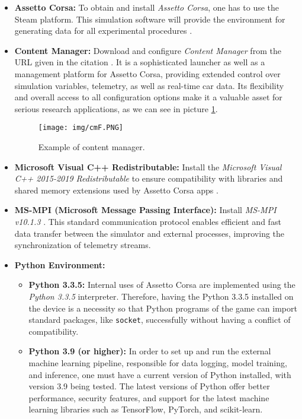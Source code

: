 \documentclass[a4paper,final,12pt]{report}
\begin{document}
\begin{itemize}
    \item \textbf{Assetto Corsa:} To obtain and install \textit{Assetto Corsa}, one has to use the Steam platform. This simulation software will provide the environment for generating data for all experimental procedures \cite{assettocorsa2025}.
    
    \item \textbf{Content Manager:} Download and configure \textit{Content Manager} from the URL given in the citation \cite{contentmanager2025}. It is a sophisticated launcher as well as a management platform for Assetto Corsa, providing extended control over simulation variables, telemetry, as well as real-time car data. Its flexibility and overall access to all configuration options make it a valuable asset for serious research applications, as we can see in picture \ref{figura:CM}.
    \begin{figure}[hbtp]
    \centering
    \texttt{[image: img/cmF.PNG]}
    \caption{Example of content manager.}
    \label{figura:CM}
    \end{figure}
    
    \item \textbf{Microsoft Visual C++ Redistributable:} Install the \textit{Microsoft Visual C++ 2015-2019 Redistributable} to ensure compatibility with libraries and shared memory extensions used by Assetto Corsa apps \cite{visualcpp2025}.
    
    \item \textbf{MS-MPI (Microsoft Message Passing Interface):} Install \textit{MS-MPI v10.1.3} \cite{msmpi2025}. This standard communication protocol enables efficient and fast data transfer between the simulator and external processes, improving the synchronization of telemetry streams.
    
    \item \textbf{Python Environment:}
    \begin{itemize}
        \item \textbf{Python 3.3.5:} Internal uses of Assetto Corsa are implemented using the \textit{Python 3.3.5} interpreter. Therefore, having the Python 3.3.5 installed on the device is a necessity so that Python programs of the game can import standard packages, like \texttt{socket}, successfully without having a conflict of compatibility.
        \item \textbf{Python 3.9 (or higher):} In order to set up and run the external machine learning pipeline, responsible for data logging, model training, and inference, one must have a current version of Python installed, with version 3.9 being tested. The latest versions of Python offer better performance, security features, and support for the latest machine learning libraries such as TensorFlow, PyTorch, and scikit-learn.
    \end{itemize}
\end{itemize}
\end{document}
